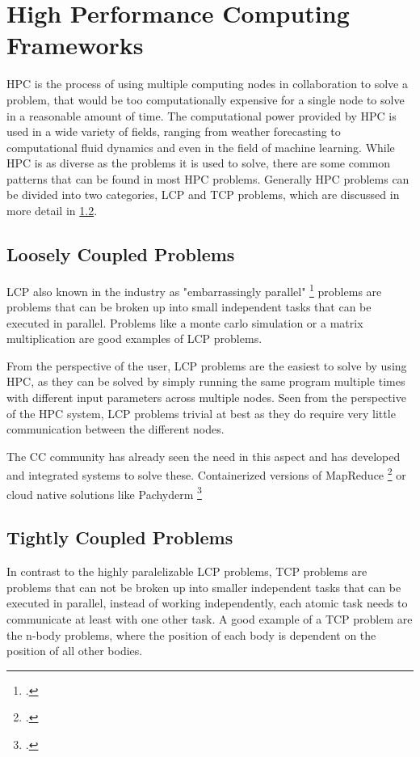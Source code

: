 \section{High Performance Computing Frameworks}

\ac{HPC} is the process of using multiple computing nodes in collaboration to solve a problem, that would be too computationally expensive for a single node to solve in a reasonable amount of time.
The computational power provided by \ac{HPC} is used in a wide variety of fields, ranging from weather forecasting to computational fluid dynamics and even in the field of machine learning.
While \ac{HPC} is as diverse as the problems it is used to solve, there are some common patterns that can be found in most \ac{HPC} problems.
Generally \ac{HPC} problems can be divided into two categories, \ac{LCP} and \ac{TCP} problems, which are discussed in more detail in \ref{state_of_the_art_tcp}.


\subsection{Loosely Coupled Problems}

\ac{LCP} also known in the industry as "embarrassingly parallel" \footcite{brownEngineeringBeowulfstyleCompute2004} problems are problems that can be broken up into small independent tasks that can be executed in parallel.
Problems like a monte carlo simulation or a matrix multiplication are good examples of \ac{LCP} problems.

From the perspective of the user, \ac{LCP} problems are the easiest to solve by using \ac{HPC}, as they can be solved by simply running the same program multiple times with different input parameters across multiple nodes.
Seen from the perspective of the \ac{HPC} system, \ac{LCP} problems trivial at best as they do require very little communication between the different nodes.

The \ac{CC} community has already seen the need in this aspect and has developed and integrated systems to solve these.
Containerized versions of MapReduce \footcite{camacho-rodriguezApacheHiveMapReduce2019} or cloud native solutions like Pachyderm \footcite{HomePagePachyderm}


\subsection{Tightly Coupled Problems}
\label{state_of_the_art_tcp}
In contrast to the highly paralelizable  \ac{LCP} problems, \ac{TCP} problems are problems that can not be broken up into smaller independent tasks that can be executed in parallel,
instead of working independently, each atomic task needs to communicate at least with one other task.
A good example of a \ac{TCP} problem are the n-body problems, where the position of each body is dependent on the position of all other bodies.

